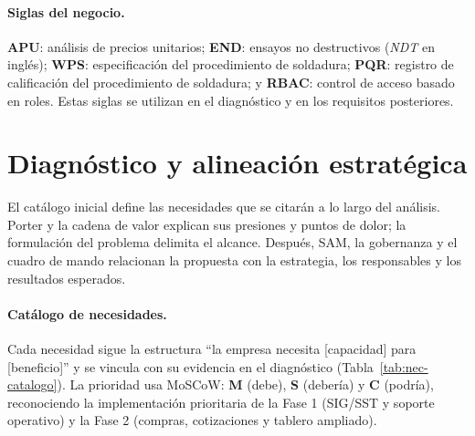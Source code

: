 \documentclass[12pt,letterpaper]{article}
\begin{document}
\paragraph{Siglas del negocio.}
\textbf{APU}: análisis de precios unitarios; \textbf{END}: ensayos no destructivos (\emph{NDT} en inglés); \textbf{WPS}: especificación del procedimiento de soldadura; \textbf{PQR}: registro de calificación del procedimiento de soldadura; y \textbf{RBAC}: control de acceso basado en roles. Estas siglas se utilizan en el diagnóstico y en los requisitos posteriores.

\section{Diagnóstico y alineación estratégica}
El catálogo inicial define las necesidades que se citarán a lo largo del análisis. Porter y la cadena de valor explican sus presiones y puntos de dolor; la formulación del problema delimita el alcance. Después, SAM, la gobernanza y el cuadro de mando relacionan la propuesta con la estrategia, los responsables y los resultados esperados.

\paragraph{Catálogo de necesidades.}
Cada necesidad sigue la estructura ``la empresa necesita [capacidad] para [beneficio]'' y se vincula con su evidencia en el diagnóstico (Tabla~\ref{tab:nec-catalogo}). La prioridad usa MoSCoW: \textbf{M} (debe), \textbf{S} (debería) y \textbf{C} (podría), reconociendo la implementación prioritaria de la Fase 1 (SIG/SST y soporte operativo) y la Fase 2 (compras, cotizaciones y tablero ampliado).
\end{document}
